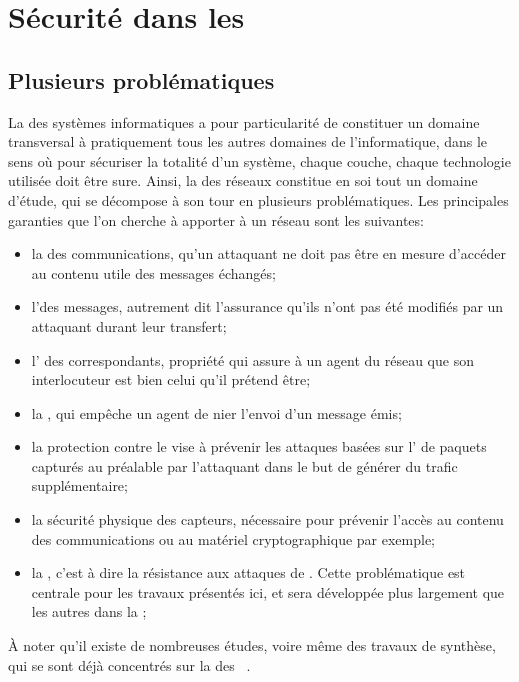 \section{Sécurité dans les \rcs}\label{ea:sec:secu}

\subsection{Plusieurs problématiques}

La \secu des systèmes informatiques a pour particularité de constituer un domaine transversal à pratiquement tous les autres domaines de l'informatique, dans le sens où pour sécuriser la totalité d'un système, chaque couche, chaque technologie utilisée doit être sure.
Ainsi, la \secu des réseaux constitue en soi tout un domaine d'étude, qui se décompose à son tour en plusieurs problématiques.
Les principales garanties que l'on cherche à apporter à un réseau sont les suivantes:
\begin{itemize}
    \item la  des communications, \cad qu'un attaquant ne doit pas être en mesure d'accéder au contenu utile des messages échangés;
    \item l'\integrite des messages, autrement dit l'assurance qu'ils n'ont pas été modifiés par un attaquant durant leur transfert;
    \item l' des correspondants, propriété qui assure à un agent du réseau que son interlocuteur est bien celui qu'il prétend être;
    \item la , qui empêche un agent de nier l'envoi d'un message émis;
    \item la protection contre le  vise à prévenir les attaques basées sur l' de paquets capturés au préalable par l'attaquant dans le but de générer du trafic supplémentaire;
    \item la sécurité physique des capteurs, nécessaire pour prévenir l'accès au contenu des communications ou au matériel cryptographique par exemple;
    \item la , c'est à dire la résistance aux attaques de \dds. Cette problématique est centrale pour les travaux présentés ici, et sera développée plus largement que les autres dans la ;
\end{itemize}
À noter qu'il existe de nombreuses études, voire même des travaux de synthèse, qui se sont déjà concentrés sur la \secu des \rcs~\cite{DYK12,AD14}.

